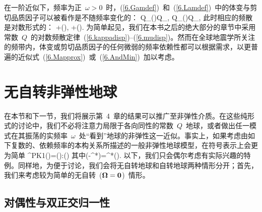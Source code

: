 在一阶近似下，频率为正~$\omega > 0$~时，(\ref{6.Gamdef})~和~(\ref{6.Lamdef})~中的体变与剪切品质因子可以被看作是不随频率变化的：
\eq
\label{6.conQmukap}
Q_{\kappa}(\omega)\approx Q_{\kappa},\qquad
Q_{\mu}(\omega)\approx Q_{\mu},
\en
此时相应的频散是对数形式的：
%
%
\eq
\label{6.kappadisp}
+\ln\left(\right),
\en
\eq
\label{6.mudisp}
+\ln\left(\right).
\en
为简单起见，我们在本书之后的绝大部分的章节中采用常数~$Q$~的对数频散定律~(\ref{6.kappadisp})--(\ref{6.mudisp})。然而在全球地震学所关注的频带内，体变或剪切品质因子的任何微弱的频率依赖性都可以根据需求，以更普遍的近似式~(\ref{6.Mapprox})~或~(\ref{6.AndMin})~加以考虑。
%
%
%
%
%
%
%

\section{无自转非弹性地球}
%
\label{6.sec.nonrot}

在本节和下一节，我们将展示第~4~章的结果可以推广至非弹性介质。在这些纯形式的讨论中，我们不必将注意力局限于各向同性的常数~$Q$~地球，或者做出任一模式在其振荡的实频率~$\omega$~处“看到”地球的非弹性这一近似。事实上，如果考虑由如下复数的、依赖频率的本构关系所描述的一般非弹性地球模型，在符号表示上会更为简单
\eq \label{6.rewrite}
\bT^{\rm PK1}(\nu)=\bLambda(\nu)\!:\!\bdel\bs(\nu)
\quad\mbox{其中}\quad\bLambda(-\nu^*)=\bLambda^*(\nu).
\en
以下，我们只会偶尔考虑有实际兴趣的特例。同样地，为便于讨论，我们会将无自转地球和自转地球两种情形分开；首先，我们来考虑较为简单的无自转~($\mbox{\boldmath $\bf \Omega$}=\mbox{${\bf 0}$}$)~情形。

\subsection{对偶性与双正交归一性}
\label{6.sec.duality}

